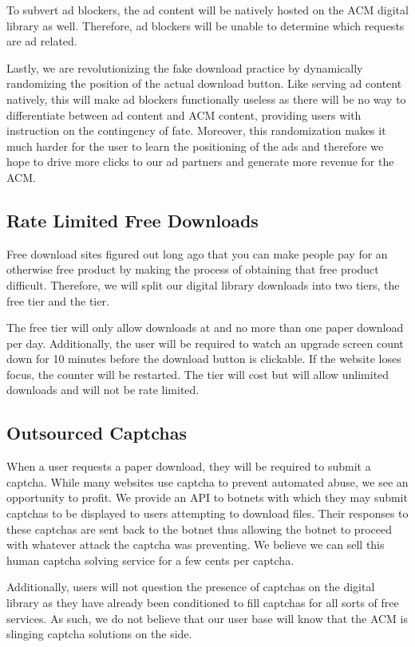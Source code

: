 To subvert ad blockers, the ad content will be natively hosted on the ACM
digital library as well.
Therefore, ad blockers will be unable to determine which requests are ad
related.

Lastly, we are revolutionizing the fake download practice by dynamically
randomizing the position of the actual download button.
Like serving ad content natively, this will make ad blockers functionally
useless as there will be no way to differentiate between ad content and ACM
content, providing users with instruction on the contingency of fate.
Moreover, this randomization makes it much harder for the user to learn the
positioning of the ads and therefore we hope to drive more clicks to our ad
partners and generate more revenue for the ACM.

\subsection{Rate Limited Free Downloads}
Free download sites figured out long ago that you can make people pay for an
otherwise free product by making the process of obtaining that free product
difficult.
Therefore, we will split our digital library downloads into two tiers, the free
tier and the \premium tier.

The free tier will only allow downloads at  and no more than one
paper download per day.
Additionally, the user will be required to watch an upgrade screen
 count down for 10 minutes before the download button is
clickable.
If the website loses focus, the counter will be restarted.
The \premium tier will cost  but will allow unlimited downloads and
will not be rate limited.


\subsection{Outsourced Captchas}
When a user requests a paper download, they will be required to submit a
captcha.
While many websites use captcha to prevent automated abuse, we see an
opportunity to profit.
We provide an API to botnets with which they may submit captchas to be
displayed to users attempting to download files.
Their responses to these captchas are sent back to the botnet thus allowing the
botnet to proceed with whatever attack the captcha was preventing.
We believe we can sell this human captcha solving service for a few cents per
captcha.

Additionally, users will not question the presence of captchas on the digital
library as they have already been conditioned to fill captchas for all sorts of
free services.
As such, we do not believe that our user base will know that the ACM is
slinging captcha solutions on the side.

